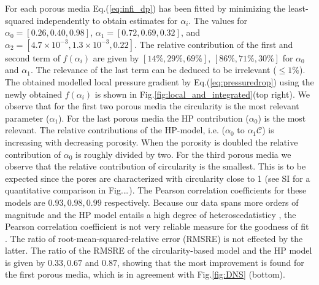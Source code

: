 \documentclass[draft]{agujournal2019}
\begin{document}
For each porous media Eq.(\ref{eq:infi_dp}) has been fitted by minimizing the least-squared independently to obtain estimates for $\alpha_i$. The values for $\alpha_0 =[0.26,0.40,0.98]$, $\alpha_1 = [0.72,0.69,0.32]$, and $\alpha_2 = [4.7\times 10^{-3},1.3 \times 10^{-3},0.22]$. The relative contribution of the first and second term of $f(\alpha_i)$ are given by $[14\%,29\%,69\%]$, $[86\%,71\%,30\%]$ for $\alpha_0$ and $\alpha_1$. The relevance of the last term can be deduced to be irrelevant ($\leq1\%$). The obtained modelled local pressure gradient by Eq.(\ref{eq:pressuredrop}) using the newly obtained $f(\alpha_i)$ is shown in Fig.\ref{fig:local_and_integrated}(top right). We observe that for the first two porous media the circularity is the most relevant parameter ($\alpha_1$). For the last porous media the HP contribution ($\alpha_0$) is the most relevant. The relative contributions of the HP-model, i.e. ($\alpha_0$ to $\alpha_1\mathcal{C}$) is increasing with decreasing porosity. When the porosity is doubled the relative contribution of $\alpha_0$ is roughly divided by two. For the third porous media we observe that the relative contribution of circularity is the smallest. This is to be expected since the pores are characterized with circularity close to 1 (see SI for a quantitative comparison in Fig.\ldots). The Pearson correlation coefficients for these models are $0.93, 0.98, 0.99$ respectively. Because our data spans more orders of magnitude and the HP model entails a high degree of heteroscedatisticy , the Pearson correlation coefficient is not very reliable measure for the goodness of fit . The ratio of root-mean-squared-relative error (RMSRE) is not effected by the latter. The ratio of the RMSRE of the circularity-based model and the HP model is given by $0.33, 0.67$ and $0.87$, showing that the most improvement is found for the first porous media, which is in agreement with Fig.\ref{fig:DNS} (bottom).


\end{document}
